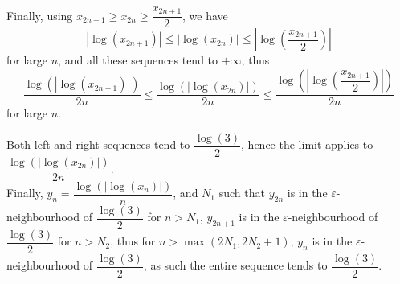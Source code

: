 \begin{solution}
    Finally, using \( x_{2n+1} \geq x_{2n} \geq \dfrac{x_{2n+1}}{2} \), we have
    \[
        \left| \log\left(x_{2n+1}\right) \right| \leq \left| \log\left(x_{2n}\right) \right| \leq \left| \log\left( \dfrac{x_{2n+1}}{2} \right) \right|
    \]
    for large \( n \), and all these sequences tend to \( +\infty \), thus
    \[
        \dfrac{\log\left( \left| \log\left(x_{2n+1}\right) \right| \right)}{2n} \leq \dfrac{\log\left( \left| \log\left(x_{2n}\right) \right| \right)}{2n} \leq \dfrac{\log\left( \left| \log\left( \dfrac{x_{2n+1}}{2} \right) \right| \right)}{2n}
    \]
    for large \( n \).

    Both left and right sequences tend to \( \dfrac{\log\left(3\right)}{2} \), hence the limit applies to \( \dfrac{\log\left( \left| \log\left(x_{2n}\right) \right| \right)}{2n} \).\\

    Finally, \( y_n = \dfrac{\log\left( \left| \log\left(x_n\right) \right| \right)}{n} \), and \( N_1 \) such that \( y_{2n} \) is in the \( \varepsilon \)-neighbourhood of \( \dfrac{\log\left(3\right)}{2} \) for \( n > N_1 \), \( y_{2n+1} \) is in the \( \varepsilon \)-neighbourhood of \( \dfrac{\log\left(3\right)}{2} \) for \( n > N_2 \), thus for \( n > \max\left(2N_1, 2N_2 + 1\right) \), \( y_n \) is in the \( \varepsilon \)-neighbourhood of \( \dfrac{\log\left(3\right)}{2} \), as such the entire sequence tends to \( \dfrac{\log\left(3\right)}{2} \).
\end{solution}

